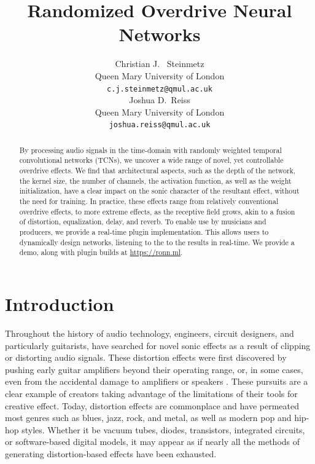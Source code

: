 \documentclass{article}
\title{Randomized Overdrive Neural Networks}
\author{%
  Christian J. ~Steinmetz \\
  Queen Mary University of London\\
  \texttt{c.j.steinmetz@qmul.ac.uk} \\
  \And
  Joshua D.~Reiss \\
  Queen Mary University of London \\
  \texttt{joshua.reiss@qmul.ac.uk} \\
}
\begin{document}
\maketitle

\begin{abstract}

By processing audio signals in the time-domain with randomly weighted temporal convolutional networks (TCNs),
we uncover a wide range of novel, yet controllable overdrive effects.
We find that architectural aspects, such as the depth of the network, 
the kernel size, the number of channels, the activation function, as well as the weight initialization, 
have a clear impact on the sonic character of the resultant effect, without the need for training. 
In practice, these effects range from relatively conventional overdrive effects,
to more extreme effects, as the receptive field grows, akin to a fusion of distortion, equalization, delay, and reverb.  
To enable use by musicians and producers, we provide a real-time plugin implementation.
This allows users to dynamically design networks, listening to the to the results in real-time.
We provide a demo, along with plugin builds at \url{https://ronn.ml}.

\end{abstract} 


\section{Introduction}

Throughout the history of audio technology, engineers, circuit designers, 
and particularly guitarists, have searched for novel sonic effects as a result of clipping or distorting audio signals. 
These distortion effects were first discovered by pushing early guitar amplifiers beyond their operating range, 
or, in some cases, even from the accidental damage to amplifiers or speakers \cite{shepherd2003distortion}. 
These pursuits are a clear example of creators taking advantage of the limitations of their tools for creative effect.
Today, distortion effects are commonplace and have permeated most genres such as blues, jazz, rock, and metal, as well as modern pop and hip-hop styles.
Whether it be vacuum tubes, diodes, transistors, integrated circuits, or software-based digital models, 
it may appear as if nearly all the methods of generating distortion-based effects have been exhausted. 
\end{document}

